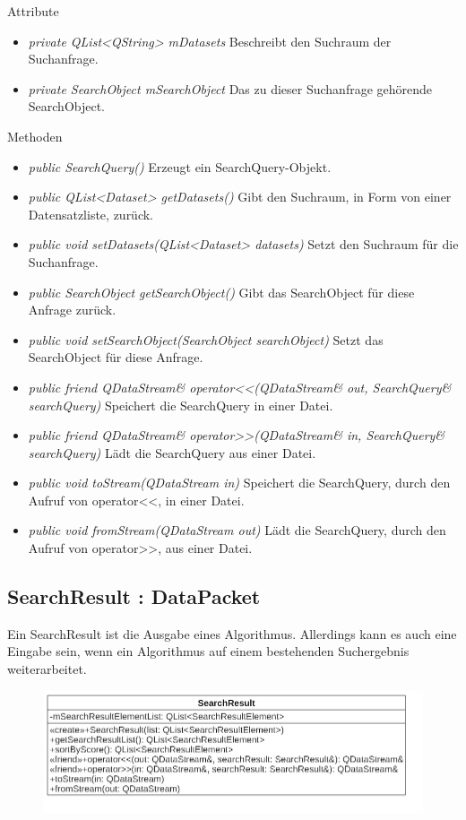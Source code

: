 Attribute
\begin{itemize}
\item\textit{private QList<QString> mDatasets} Beschreibt den Suchraum der Suchanfrage.
\item\textit{private SearchObject mSearchObject} Das zu dieser Suchanfrage gehörende SearchObject.
\end{itemize}

Methoden
\begin{itemize}
\item \textit{public SearchQuery()} Erzeugt ein SearchQuery-Objekt.
\item \textit{public QList<Dataset> getDatasets()} Gibt den Suchraum, in Form von einer Datensatzliste, zurück.
\item \textit{public void setDatasets(QList<Dataset> datasets)} Setzt den Suchraum für die Suchanfrage.
\item \textit{public SearchObject getSearchObject()} Gibt das SearchObject für diese Anfrage zurück.
\item \textit{public void setSearchObject(SearchObject searchObject)} Setzt das SearchObject für diese Anfrage.
\item \textit{public friend QDataStream\& operator<<(QDataStream\& out, SearchQuery\& searchQuery)} Speichert die SearchQuery in einer Datei.
\item \textit{public friend QDataStream\& operator>>(QDataStream\& in, SearchQuery\& searchQuery)} Lädt die SearchQuery aus einer Datei.
\item \textit{public void toStream(QDataStream in)} Speichert die SearchQuery, durch den Aufruf von operator<<, in einer Datei.
\item \textit{public void fromStream(QDataStream out)} Lädt die SearchQuery, durch den Aufruf von operator>>, aus einer Datei.
\end{itemize}

\subsection*{SearchResult : DataPacket}
Ein SearchResult ist die Ausgabe eines Algorithmus. Allerdings kann es auch eine Eingabe sein, wenn ein Algorithmus auf einem bestehenden Suchergebnis weiterarbeitet.

\begin{figure}[H]
\centering
\includegraphics[scale=0.5]{img/Klassendiagramm/Klassen/SearchResult}
\label{fig:searchResult}
\end{figure}

